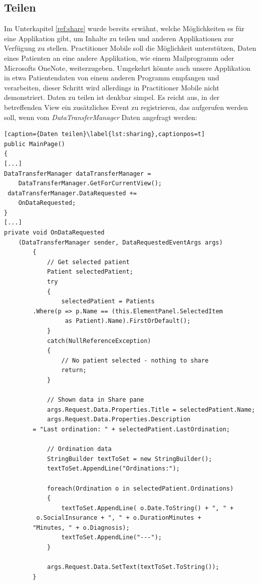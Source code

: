 \documentclass[a4paper,bibtotoc,oneside]{scrbook}
\begin{document}
\subsection[Teilen]{Teilen}
Im Unterkapitel \ref{ref:share} wurde bereits erwähnt, welche Möglichkeiten es für eine Applikation gibt, um Inhalte zu teilen und anderen Applikationen zur Verfügung zu stellen.
\newline
Practitioner Mobile soll die Möglichkeit unterstützen, Daten eines Patienten an eine andere Applikation, wie einem Mailprogramm oder Microsofts OneNote, weiterzugeben.
\newline
Umgekehrt könnte auch unsere Applikation in etwa Patientendaten von einem anderen Programm empfangen und verarbeiten, dieser Schritt wird allerdings in Practitioner Mobile nicht demonstriert.
\newline
\newline
Daten zu teilen ist denkbar simpel. Es reicht aus, in der betreffenden View ein zusätzliches Event zu registrieren, das aufgerufen werden soll, wenn vom \textit{DataTransferManager} Daten angefragt werden:
\begin{lstlisting}[caption={Daten teilen}\label{lst:sharing},captionpos=t]
public MainPage()
{
[...]
DataTransferManager dataTransferManager = 
	DataTransferManager.GetForCurrentView();
 dataTransferManager.DataRequested += 
	OnDataRequested;
}
[...]
private void OnDataRequested
	(DataTransferManager sender, DataRequestedEventArgs args)
        {
            // Get selected patient
            Patient selectedPatient;
            try
            {
                selectedPatient = Patients
		.Where(p => p.Name == (this.ElementPanel.SelectedItem
				 as Patient).Name).FirstOrDefault();
            }
            catch(NullReferenceException)
            {
                // No patient selected - nothing to share
                return;
            }

            // Shown data in Share pane
            args.Request.Data.Properties.Title = selectedPatient.Name;
            args.Request.Data.Properties.Description 
		= "Last ordination: " + selectedPatient.LastOrdination;

            // Ordination data
            StringBuilder textToSet = new StringBuilder();
            textToSet.AppendLine("Ordinations:");

            foreach(Ordination o in selectedPatient.Ordinations)
            {
                textToSet.AppendLine( o.Date.ToString() + ", " +
		 o.SocialInsurance + ", " + o.DurationMinutes + 
		"Minutes, " + o.Diagnosis);
                textToSet.AppendLine("---");
            }

            args.Request.Data.SetText(textToSet.ToString());
        }
\end{lstlisting}
\end{document}
